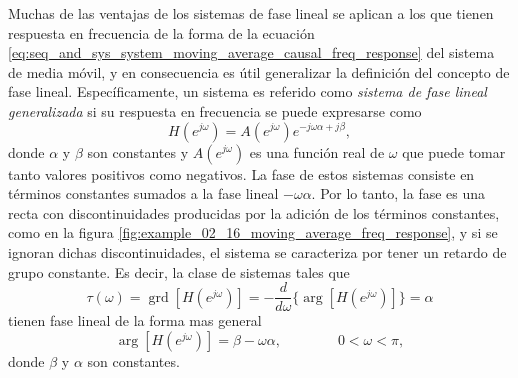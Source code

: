 \documentclass[a4paper]{report}
\DeclareMathOperator{\grd}{grd}
\begin{document}
Muchas de las ventajas de los sistemas de fase lineal se aplican a los que tienen respuesta en frecuencia de la forma de la ecuación \ref{eq:seq_and_sys_system_moving_average_causal_freq_response} del sistema de media móvil, y en consecuencia es útil generalizar la definición del concepto de fase lineal. Específicamente, un sistema es referido como \emph{sistema de fase lineal generalizada} si su respuesta en frecuencia se puede expresarse como
\begin{equation}\label{eq:transform_analysis_generalizaed_lineal_phase_system_freq_response}
 H(e^{j\omega})=A(e^{j\omega})e^{-j\omega\alpha+j\beta}, 
\end{equation}
donde \(\alpha\) y \(\beta\) son constantes y \(A(e^{j\omega})\) es una función real de \(\omega\) que puede tomar tanto valores positivos como negativos. La fase de estos sistemas consiste en términos constantes sumados a la fase lineal \(-\omega\alpha\). Por lo tanto, la fase es una recta con discontinuidades producidas por la adición de los términos constantes, como en la figura \ref{fig:example_02_16_moving_average_freq_response}, y si se ignoran dichas discontinuidades, el sistema se caracteriza por tener un retardo de grupo constante. Es decir, la clase de sistemas tales que
\[
 \tau(\omega)=\grd[H(e^{j\omega})]=-\frac{d}{d\omega}\{\arg[H(e^{j\omega})]\}=\alpha
\]
tienen fase lineal de la forma mas general
\[
 \arg[H(e^{j\omega})]=\beta-\omega\alpha,
 \qquad\qquad
 0<\omega<\pi,
\]
donde \(\beta\) y \(\alpha\) son constantes.
\end{document}
